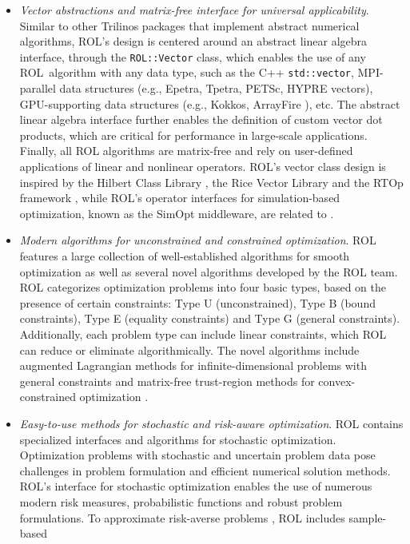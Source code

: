 \begin{itemize}
\item
\emph{Vector abstractions and matrix-free interface for universal applicability}.
Similar to other Trilinos packages that implement abstract numerical
algorithms, ROL's design is centered around an abstract linear algebra
interface, through the {\tt ROL::Vector} class, which enables the use of any
ROL~algorithm with any data type, such as the C++ {\tt std::vector}, MPI-parallel
data structures (e.g., Epetra, Tpetra, PETSc, HYPRE vectors), GPU-supporting data
structures (e.g., Kokkos, ArrayFire \cite{Yalamanchili2015}), etc.  The abstract
linear algebra interface further enables the definition of custom vector dot
products, which are critical for performance in large-scale applications.
Finally, all ROL algorithms are matrix-free and rely on user-defined
applications of linear and nonlinear operators.  ROL's vector class design is
inspired by the Hilbert Class Library \cite{hcl}, the Rice Vector Library \cite{rvl}
and the RTOp framework \cite{rtop}, while ROL's operator interfaces for
simulation-based optimization, known as the SimOpt middleware,
are related to \cite{Heinkenschloss1999}.
\item
\emph{Modern algorithms for unconstrained and constrained optimization}.
ROL features a large collection of well-established algorithms for smooth
optimization as well as several novel algorithms developed by the ROL team.
ROL categorizes optimization problems into four basic types, based on the
presence of certain constraints: Type U (unconstrained), Type B (bound
constraints), Type E (equality constraints) and Type G (general constraints).
Additionally, each problem type can include linear constraints, which ROL can
reduce or eliminate algorithmically. The novel algorithms include augmented
Lagrangian methods for infinite-dimensional problems with general constraints
\cite{ALESQP} and matrix-free trust-region methods for convex-constrained
optimization \cite{Kouri2022}.
\item
\emph{Easy-to-use methods for stochastic and risk-aware optimization}.
ROL contains specialized interfaces and algorithms for stochastic optimization.
Optimization problems with stochastic and uncertain problem data pose challenges
in problem formulation and efficient numerical solution methods.  ROL's interface
for stochastic optimization enables the use of numerous modern risk measures,
probabilistic functions and robust problem formulations. To approximate
risk-averse problems \cite{shapiro2021lectures}, ROL includes sample-based

\end{itemize}
